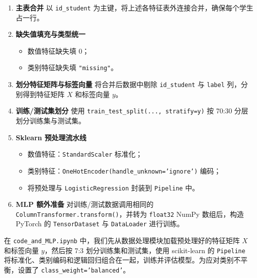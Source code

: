 \documentclass{SYSUReport}
\begin{document}
\begin{enumerate}[1.]
  \item \textbf{主表合并}  
    以 \texttt{id\_student} 为主键，将上述各特征表外连接合并，确保每个学生占一行。

  \item \textbf{缺失值填充与类型统一}  
    \begin{itemize}
      \item 数值特征缺失填 0；  
      \item 类别特征缺失填 \texttt{"missing"}。
    \end{itemize}

  \item \textbf{划分特征矩阵与标签向量}  
    将合并后数据中剔除 \texttt{id\_student} 与 \texttt{label} 列，分别得到特征矩阵 \(X\) 和标签向量 \(y\)。

  \item \textbf{训练/测试集划分}  
    使用 \texttt{train\_test\_split(..., stratify=y)} 按 70:30 分层划分训练集与测试集。

  \item \textbf{Sklearn 预处理流水线}  
    \begin{itemize}
      \item 数值特征：\texttt{StandardScaler} 标准化；  
      \item 类别特征：\texttt{OneHotEncoder(handle\_unknown='ignore')} 编码；  
      \item 将预处理与 \texttt{LogisticRegression} 封装到 \texttt{Pipeline} 中。
    \end{itemize}

  \item \textbf{MLP 额外准备}  
    对训练/测试数据调用相同的 \texttt{ColumnTransformer.transform()}，并转为 \texttt{float32} NumPy 数组后，构造 PyTorch 的 \texttt{TensorDataset} 与 \texttt{DataLoader} 进行训练。
\end{enumerate}

在 \texttt{code\logistic_and_MLP.ipynb} 中，我们先从数据处理模块加载预处理好的特征矩阵 \(X\) 和标签向量 \(y\)，然后按 7:3 划分训练集和测试集，使用 scikit-learn 的 \texttt{Pipeline} 将标准化、类别编码和逻辑回归组合在一起，训练并评估模型。为应对类别不平衡，设置了 \texttt{class\_weight='balanced'}。
\end{document}
